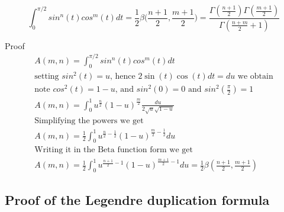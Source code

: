 \documentclass[a4paper]{article}
\begin{document}
    \begin{theorem}
        \begin{equation}
            \boxed{
                \int_{0}^{\pi/2} sin^{n}(t) cos^{m}(t) dt = \frac{1}{2} \beta \Big( \frac{n+1}{2}, \frac{m+1}{2} \Big)
                =
                \frac{\Gamma(\frac{n+1}{2}) \Gamma(\frac{m+1}{2})}{\Gamma(\frac{n+m}{2} + 1)}
            }\label{eq:equation25}
        \end{equation}

        Proof
        \\
        \begin{gather*}
            A(m, n) = \int_{0}^{\pi/2} sin^{n}(t) cos^{m}(t) dt
            \\
            \text{setting $sin^{2}(t) = u$, hence $2 \sin(t) \cos(t) dt = du$ we obtain}
            \\
            \text{note $cos^{2}(t) = 1-u$, and $sin^{2}(0) = 0$ and $sin^{2} \left( \frac{\pi}{2} \right) = 1$}
            \\
            A(m, n) = \int_{0}^{1} u^{\frac{n}{2}} (1-u)^{\frac{m}{2}} \frac{du}{2 \sqrt{u} \sqrt{1-u}}
            \\
            \text{Simplifying the powers we get}
            \\
            A(m, n) = \frac{1}{2} \int_{0}^{1} u^{\frac{n}{2} -\frac{1}{2}} (1-u)^{\frac{m}{2}-\frac{1}{2}} du
            \\
            \text{Writing it in the Beta function form we get}
            \\
            A(m, n) = \frac{1}{2} \int_{0}^{1} u^{\frac{n+1}{2}- 1} (1-u)^{\frac{m+1}{2} -1} du = \frac{1}{2} \beta(\frac{n+1}{2}, \frac{m+1}{2})
        \end{gather*}
    \end{theorem}

    \subsection{Proof of the Legendre duplication formula} \label{subsec:proof-of-leg-dup}
\end{document}
